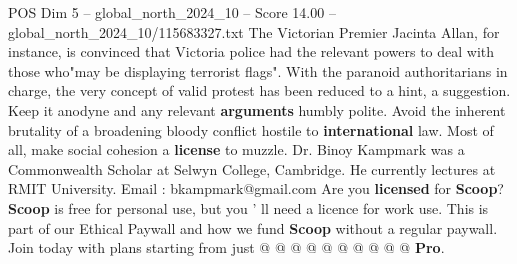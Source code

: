 \begin{textsample}{POS Dim 5 – global\_north\_2024\_10 – Score 14.00 – global\_north\_2024\_10/115683327.txt}
The Victorian Premier Jacinta Allan, for instance, is convinced that Victoria police had the relevant powers to deal with those who"may be displaying terrorist flags".
With the paranoid authoritarians in charge, the very concept of valid protest has been reduced to a hint, a suggestion.
Keep it anodyne and any relevant \textbf{arguments} humbly polite.
Avoid the inherent brutality of a broadening bloody conflict hostile to \textbf{international} law.
Most of all, make social cohesion a \textbf{license} to muzzle.
Dr.
Binoy Kampmark was a Commonwealth Scholar at Selwyn College, Cambridge.
He currently lectures at RMIT University.
Email : bkampmark@gmail.com Are you \textbf{licensed} for \textbf{Scoop}? \textbf{Scoop} is free for personal use, but you ' ll need a licence for work use.
This is part of our Ethical Paywall and how we fund \textbf{Scoop} without a regular paywall.
Join today with plans starting from just @ @ @ @ @ @ @ @ @ @ \textbf{Pro}.

\end{textsample}
